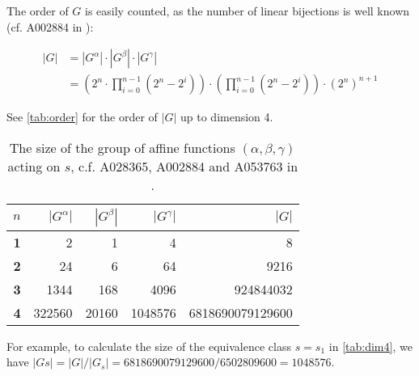 The order of $G$ is easily counted, as the number of linear bijections is well known (cf. A002884 in \cite{oeis}):

\begin{equation}
\begin{aligned}
|G| & = |G^\alpha|\cdot|G^\beta|\cdot|G^\gamma| \\
& = \left( 2^n \cdot \prod_{i=0}^{n-1}(2^n-2^i) \right)\cdot
\left( \prod_{i=0}^{n-1}(2^n-2^i)\right)
\cdot{(2^n)}^{n+1}
\end{aligned}
\end{equation}

See \autoref{tab:order} for the order of $|G|$ up to dimension 4.

\begin{table}\centering
\begin{tabular}{>{\bfseries}rrrrr}
\toprule
$n$ & $|G^\alpha|$ & $|G^\beta|$ & $|G^\gamma|$ & $|G|$ \\
\midrule
1 & 2 & 1 & 4 & 8 \\
2 & 24 & 6 & 64 & 9216 \\
3 & 1344 & 168 & 4096 & 924844032 \\
4 & 322560 & 20160 & 1048576 & 6818690079129600 \\
 \bottomrule
\end{tabular}
\caption{The size of the group of affine functions $(\alpha, \beta, \gamma)$ acting on $s$, c.f. A028365, A002884 and A053763 in \cite{oeis}.}
\label{tab:order}
\end{table}

For example, to calculate the size of the equivalence class $s=s_1$ in \autoref{tab:dim4}, we have $|Gs| = |G|/|G_s| = 6818690079129600 / 6502809600 = 1048576$.
